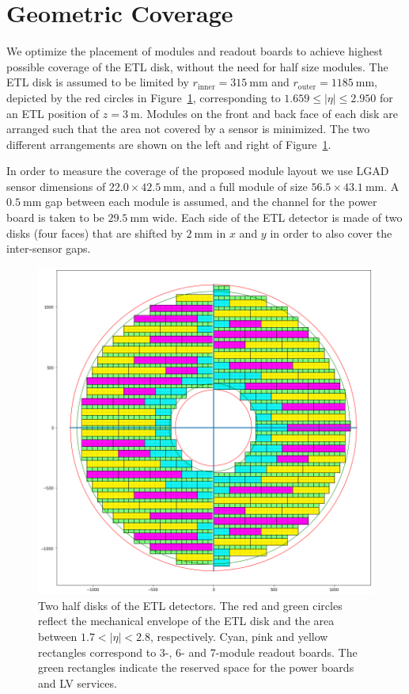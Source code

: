\documentclass[11pt]{article}
\begin{document}
\section{Geometric Coverage}

We optimize the placement of modules and readout boards to achieve highest possible coverage of the ETL disk, without the need for half size modules.
The ETL disk is assumed to be limited by $r_{\mathrm{inner}}=315~\mathrm{mm}$ and $r_{\mathrm{outer}}=1185~\mathrm{mm}$, depicted by the red circles in Figure~\ref{fig:coverage_both}, corresponding to $1.659 \leq |\eta| \leq 2.950$ for an ETL position of $z=3~\mathrm{m}$.
Modules on the front and back face of each disk are arranged such that the area not covered by a sensor is minimized.
The two different arrangements are shown on the left and right of Figure~\ref{fig:coverage_both}.

In order to measure the coverage of the proposed module layout we use LGAD sensor dimensions of $22.0 \times 42.5~\mathrm{mm}$, and a full module of size $56.5 \times 43.1~\mathrm{mm}$.
A $0.5~\mathrm{mm}$ gap between each module is assumed, and the channel for the power board is taken to be $29.5~\mathrm{mm}$ wide.
Each side of the ETL detector is made of two disks (four faces) that are shifted by $2~\mathrm{mm}$ in $x$ and $y$ in order to also cover the inter-sensor gaps.

\begin{figure}[!ht]
\centering
\includegraphics[width=0.60 \textwidth]{figures/coverage_both.png}
\caption{
Two half disks of the ETL detectors.
The red and green circles reflect the mechanical envelope of the ETL disk and the area between $1.7<|\eta|<2.8$, respectively.
Cyan, pink and yellow rectangles correspond to 3-, 6- and 7-module readout boards.
The green rectangles indicate the reserved space for the power boards and LV services.
}
\label{fig:coverage_both}
\end{figure}
\end{document}
